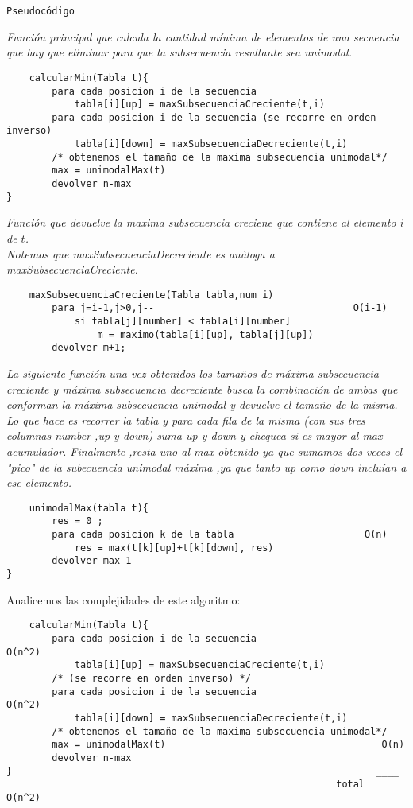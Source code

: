 \texttt{Pseudocódigo}

\textit{Función principal que calcula la cantidad mínima de elementos de una secuencia que hay que eliminar para que la subsecuencia resultante sea unimodal.}
\begin{verbatim}
    calcularMin(Tabla t){
        para cada posicion i de la secuencia
            tabla[i][up] = maxSubsecuenciaCreciente(t,i)
        para cada posicion i de la secuencia (se recorre en orden inverso)
            tabla[i][down] = maxSubsecuenciaDecreciente(t,i)
        /* obtenemos el tamaño de la maxima subsecuencia unimodal*/   
        max = unimodalMax(t)     
        devolver n-max
}
\end{verbatim}

\textit{Función que devuelve la maxima subsecuencia creciene que contiene al elemento $i$ de $t$.\\
Notemos que maxSubsecuenciaDecreciente es anàloga a maxSubsecuenciaCreciente.}

\begin{verbatim}                   
    maxSubsecuenciaCreciente(Tabla tabla,num i)    
        para j=i-1,j>0,j--                                   O(i-1)
            si tabla[j][number] < tabla[i][number]
                m = maximo(tabla[i][up], tabla[j][up]) 	
        devolver m+1;
\end{verbatim}


\textit{La siguiente función una vez obtenidos los tamaños de máxima subsecuencia creciente y máxima subsecuencia decreciente busca la combinación de ambas que conforman la máxima subsecuencia unimodal y devuelve el tamaño de la misma.
Lo que hace es recorrer la tabla y para cada fila de la misma (con sus tres columnas number ,up y down) suma up y down y chequea si es mayor al max acumulador.
Finalmente ,resta uno al max obtenido ya que sumamos dos veces el "pico" de la subecuencia unimodal máxima ,ya que tanto up como down incluían a ese elemento.}

\begin{verbatim}
    unimodalMax(tabla t){
        res = 0 ;
        para cada posicion k de la tabla                       O(n)
            res = max(t[k][up]+t[k][down], res)
        devolver max-1
}
\end{verbatim}


Analicemos las complejidades de este algoritmo:

\begin{verbatim}
    calcularMin(Tabla t){
        para cada posicion i de la secuencia                     O(n^2)
            tabla[i][up] = maxSubsecuenciaCreciente(t,i)
        /* (se recorre en orden inverso) */
        para cada posicion i de la secuencia                     O(n^2)  
            tabla[i][down] = maxSubsecuenciaDecreciente(t,i)
        /* obtenemos el tamaño de la maxima subsecuencia unimodal*/   
        max = unimodalMax(t)                                      O(n)  
        devolver n-max
}                                                                ____
                                                          total  O(n^2)
\end{verbatim}

